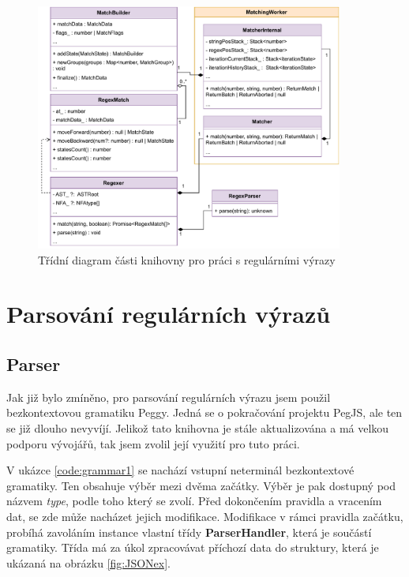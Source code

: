 
\begin{figure}[!h]
	\centering
	\includegraphics[width=0.9\textwidth]{Figures/UML_RGXR.pdf}
	\caption{Třídní diagram části knihovny pro práci s regulárními výrazy}
	\label{fig:ARCH_RGXR}
\end{figure} 

\section{Parsování regulárních výrazů}\label{sec:Parse}

\subsection*{Parser}

Jak již bylo zmíněno, pro parsování regulárních výrazu jsem použil bezkontextovou gramatiku Peggy.
Jedná se o pokračování projektu PegJS, ale ten se již dlouho nevyvíjí. 
Jelikož tato knihovna je stále aktualizována a má velkou podporu vývojářů, tak jsem zvolil její využití pro tuto práci.

V ukázce \ref{code:grammar1} se nachází vstupní neterminál bezkontextové gramatiky. 
Ten obsahuje výběr mezi dvěma začátky.
Výběr je pak dostupný pod názvem \textit{type}, podle toho který se zvolí.
Před dokončením pravidla a vracením dat, se zde může nacházet jejich modifikace.
Modifikace v rámci pravidla začátku, probíhá zavoláním instance vlastní třídy \textbf{ParserHandler}, která je součástí gramatiky.
Třída má za úkol zpracovávat příchozí data do struktury, která je ukázaná na obrázku \ref{fig:JSONex}.

